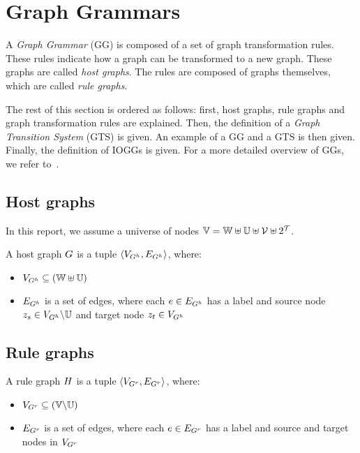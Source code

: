 \section{Graph Grammars}\label{sec:graph}
A \textit{Graph Grammar} (GG) is composed of a set of graph transformation rules. These rules indicate how a graph can be transformed to a new graph. These graphs are called \textit{host graphs}. The rules are composed of graphs themselves, which are called \textit{rule graphs}.

The rest of this section is ordered as follows: first, host graphs, rule graphs and graph transformation rules are explained. Then, the definition of a \textit{Graph Transition System} (GTS) is given. An example of a GG and a GTS is then given. Finally, the definition of IOGGs is given. For a more detailed overview of GGs, we refer to~\cite{Rensink:graph_grammars, Heckel2006187, Andries1999}.

\subsection{Host graphs}
In this report, we assume a universe of nodes $\mathbb{V} = \mathbb{W} \uplus \mathbb{U} \uplus \mathcal{V} \uplus 2^{\mathcal{T}}$.

A host graph $G$ is a tuple $\langle V_{G^h}, E_{G^h}\rangle$, where:
\begin{itemize}
  \item $V_{G^h} \subseteq (\mathbb{W} \uplus \mathbb{U})$
  \item $E_{G^h}$ is a set of edges, where each $e \in E_{G^h}$ has a label and source node $z_s \in V_{G^h}\backslash\mathbb{U}$ and target node $z_t\in V_{G^h}$
\end{itemize}

\subsection{Rule graphs}
A rule graph $H$ is a tuple $\langle V_{G^r}, E_{G^r} \rangle$, where:
\begin{itemize}
  \item $V_{G^r} \subseteq (\mathbb{V} \backslash \mathbb{U})$
  \item $E_{G^r}$ is a set of edges, where each $e \in E_{G^r}$ has a label and source and target nodes in $V_{G^r}$
\end{itemize}

